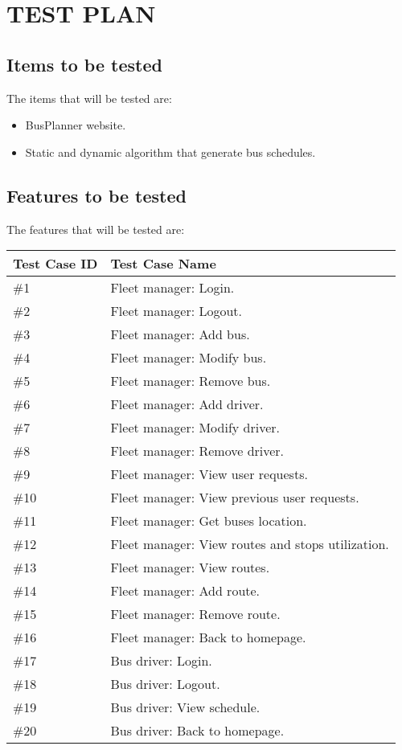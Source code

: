 \section{TEST PLAN}

\subsection{Items to be tested}
The items that will be tested are:
\begin{itemize}
	\item BusPlanner website.
	\item Static and dynamic algorithm that generate bus schedules.
\end{itemize}

\subsection{Features to be tested}
The features that will be tested are:
\begin{center}
	\begin{tabular} { | m{3cm} | m{10cm} | }
		\hline
		\textbf{Test Case ID} & \textbf{Test Case Name}\\
		\hline
		\#1 & Fleet manager: Login.\\
		\hline
		\#2 & Fleet manager: Logout.\\
		\hline
		\#3 & Fleet manager: Add bus.\\
		\hline
		\#4 & Fleet manager: Modify bus.\\
		\hline
		\#5 & Fleet manager: Remove bus.\\
		\hline
		\#6 & Fleet manager: Add driver.\\
		\hline
		\#7 & Fleet manager: Modify driver.\\
		\hline
		\#8 & Fleet manager: Remove driver.\\
		\hline
		\#9 & Fleet manager: View user requests.\\
		\hline
		\#10 & Fleet manager: View previous user requests.\\
		\hline
		\#11 & Fleet manager: Get buses location.\\
		\hline
		\#12 & Fleet manager: View routes and stops utilization.\\
		\hline
		\#13 & Fleet manager: View routes.\\
		\hline
		\#14 & Fleet manager: Add route.\\
		\hline
		\#15 & Fleet manager: Remove route.\\
		\hline
		\#16 & Fleet manager: Back to homepage.\\
		\hline
		\#17 & Bus driver: Login.\\
		\hline
		\#18 & Bus driver: Logout.\\
		\hline
		\#19 & Bus driver: View schedule.\\
		\hline
		\#20 & Bus driver: Back to homepage.\\
		\hline
	\end{tabular}
\end{center}
\newpage
